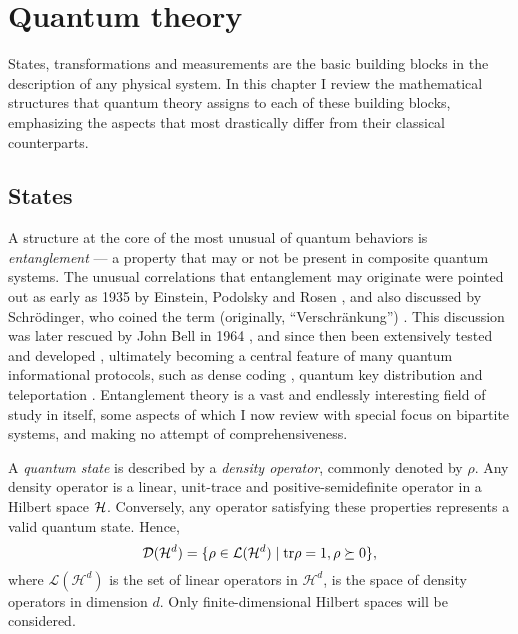 
\chapter{Quantum theory}
\thispagestyle{empty}  %
\label{chap:quantum-theory}

	States, transformations and measurements are the basic building blocks in the description of any physical system. In this chapter I review the mathematical structures that quantum theory assigns to each of these building blocks, emphasizing the aspects that most drastically differ from their classical counterparts. 

	\section{States}
	\label{sec:states}

		A structure at the core of the most unusual of quantum behaviors is \emph{entanglement} --- a property that may or not be present in composite quantum systems. The unusual correlations that entanglement may originate were pointed out as early as 1935 by Einstein, Podolsky and Rosen \cite{epr}, and also discussed by Schrödinger, who coined the term (originally, ``Verschränkung'') \cite{schrodinger_1935}. This discussion was later rescued by John Bell in 1964 \cite{bell_1964}, and since then been extensively tested and developed \cite{horodecki_2009_entanglement}, ultimately becoming a central feature of many quantum informational protocols, such as dense coding \cite{bennett_1992_superdense}, quantum key distribution \cite{bb84} and teleportation \cite{bennett_1993_teleporting}. Entanglement theory is a vast and endlessly interesting field of study in itself, some aspects of which I now review with special focus on bipartite systems, and making no attempt of comprehensiveness.

		\ornamentbreak
	
		A \emph{quantum state} is described by a \emph{density operator}, commonly denoted by $\rho$. Any density operator is a linear, unit-trace and positive-semidefinite operator in a Hilbert space $\mathcal{H}$. Conversely, any operator satisfying these properties represents a valid quantum state. Hence,
		\begin{equation}
			\mathcal{D}(\mathcal{H}^{d}) = \{ \rho \in \mathcal{L}(\mathcal{H}^d) \mid \text{tr}\rho=1, \rho \succeq0 \} , 
			\label{eq:density-operator}
		\end{equation}
		where $\mathcal{L}(\mathcal{H}^d)$ is the set of linear operators in $\mathcal{H}^d$, is the space of density operators in dimension $d$. Only finite-dimensional Hilbert spaces will be considered.
	
